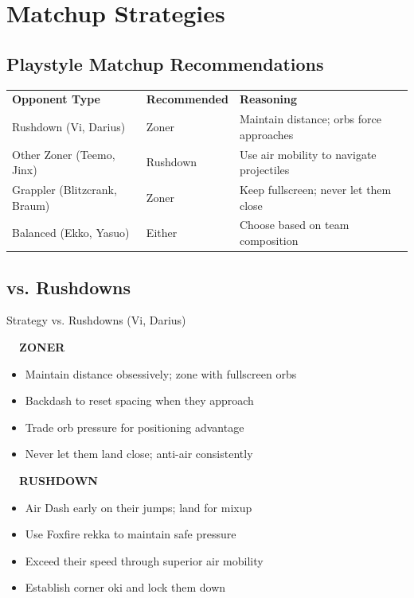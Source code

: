 \documentclass[12pt, a4paper]{report}
\newcommand{\faFistRaised}{\ding{108}}
\newcommand{\faBookOpen}{\ding{70}}
\begin{document}
\clearpage

\chapter{Matchup Strategies}

\section{Playstyle Matchup Recommendations}

\begin{center}
\begin{tabularx}{\linewidth}{L{3.5cm} L{3.5cm} L{6cm}}
\textcolor{ahriCyan}{\textbf{Opponent Type}} & \textcolor{ahriCyan}{\textbf{Recommended}} & \textcolor{ahriCyan}{\textbf{Reasoning}} \\
Rushdown (Vi, Darius) & Zoner & Maintain distance; orbs force approaches \\
Other Zoner (Teemo, Jinx) & Rushdown & Use air mobility to navigate projectiles \\
Grappler (Blitzcrank, Braum) & Zoner & Keep fullscreen; never let them close \\
Balanced (Ekko, Yasuo) & Either & Choose based on team composition \\
\end{tabularx}
\end{center}

\section{vs. Rushdowns}

\begin{matchupbox}[]{Strategy vs. Rushdowns (Vi, Darius)}
\begin{multicols}{2}
\textcolor{ahriCyan}{\bfseries\sffamily\faBookOpen\ \ ZONER}
\begin{itemize}
  \item Maintain distance obsessively; zone with fullscreen orbs
  \item Backdash to reset spacing when they approach
  \item Trade orb pressure for positioning advantage
  \item Never let them land close; anti-air consistently
\end{itemize}
\columnbreak
\textcolor{ahriMagenta}{\bfseries\sffamily\faFistRaised\ \ RUSHDOWN}
\begin{itemize}
  \item Air Dash early on their jumps; land for mixup
  \item Use Foxfire rekka to maintain safe pressure
  \item Exceed their speed through superior air mobility
  \item Establish corner oki and lock them down
\end{itemize}
\end{multicols}
\end{matchupbox}
\end{document}
